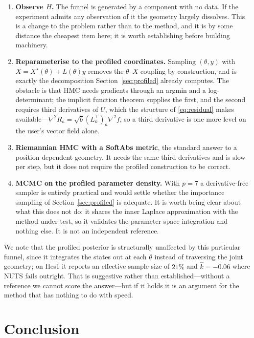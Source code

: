 \documentclass[11pt]{article}
\newcommand{\khat}{\widehat{k}}
\theoremstyle{plain}
\theoremstyle{definition}
\theoremstyle{remark}
\begin{document}
\begin{enumerate}[leftmargin=1.5em,itemsep=2pt]
\item \textbf{Observe $H$.} The funnel is generated by a component with no data. If the
  experiment admits any observation of it the geometry largely dissolves. This is a change to the
  problem rather than to the method, and it is by some distance the cheapest item here; it is worth
  establishing before building machinery.
\item \textbf{Reparameterise to the profiled coordinates.} Sampling
  $(\theta, y)$ with $X = X^\star(\theta) + L(\theta)y$ removes the $\theta$--$X$ coupling by
  construction, and is exactly the decomposition Section~\ref{sec:profiled} already computes. The
  obstacle is that HMC needs gradients through an argmin and a log-determinant; the implicit
  function theorem supplies the first, and the second requires third derivatives of $U$, which the
  structure of \eqref{eq:residual} makes available---$\nabla^2 R_a = \sqrt b (L_k^\top)_a\nabla^2f$,
  so a third derivative is one more level on the user's vector field alone.
\item \textbf{Riemannian HMC with a SoftAbs metric}, the standard answer to a position-dependent
  geometry. It needs the same third derivatives and is slow per step, but it does not require the
  profiled construction to be correct.
\item \textbf{MCMC on the profiled parameter density.} With $p = 7$ a derivative-free sampler is
  entirely practical and would settle whether the importance sampling of
  Section~\ref{sec:profiled} is adequate. It is worth being clear about what this does not do: it
  shares the inner Laplace approximation with the method under test, so it validates the
  parameter-space integration and nothing else. It is not an independent reference.
\end{enumerate}

We note that the profiled posterior is structurally unaffected by this particular funnel, since it
integrates the states out at each $\theta$ instead of traversing the joint geometry; on Hes1 it
reports an effective sample size of $21\%$ and $\khat = -0.06$ where NUTS fails outright. That is
suggestive rather than established---without a reference we cannot score the answer---but if it
holds it is an argument for the method that has nothing to do with speed.

\section{Conclusion}
\end{document}
